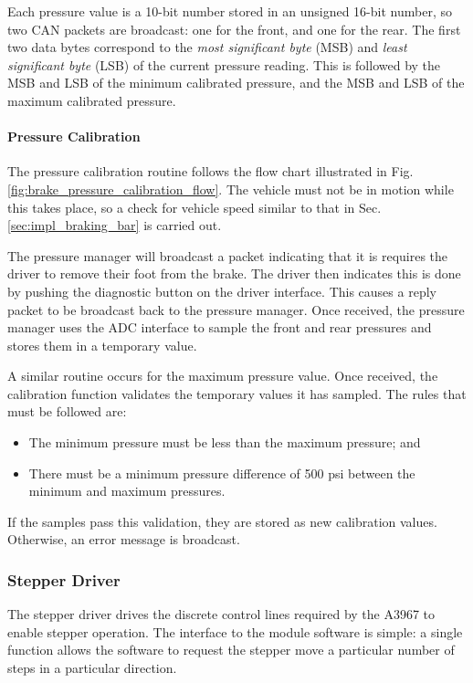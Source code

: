 Each pressure value is a 10-bit number stored in an unsigned 16-bit number, so two CAN packets are broadcast: one for the front, and one for the rear. The first two data bytes correspond to the \emph{most significant byte} (MSB) and \emph{least significant byte} (LSB) of the current pressure reading. This is followed by the MSB and LSB of the minimum calibrated pressure, and the MSB and LSB of the maximum calibrated pressure.

\paragraph{Pressure Calibration}

The pressure calibration routine follows the flow chart illustrated in Fig. \ref{fig:brake_pressure_calibration_flow}. The vehicle must not be in motion while this takes place, so a check for vehicle speed similar to that in Sec. \ref{sec:impl_braking_bar} is carried out. 

The pressure manager will broadcast a packet indicating that it is requires the driver to remove their foot from the brake. The driver then indicates this is done by pushing the diagnostic button on the driver interface. This causes a reply packet to be broadcast back to the pressure manager. Once received, the pressure manager uses the ADC interface to sample the front and rear pressures and stores them in a temporary value.

A similar routine occurs for the maximum pressure value. Once received, the calibration function validates the temporary values it has sampled. The rules that must be followed are:

\begin{itemize}
\item The minimum pressure must be less than the maximum pressure; and
\item There must be a minimum pressure difference of 500 psi between the minimum and maximum pressures.
\end{itemize}

If the samples pass this validation, they are stored as new calibration values. Otherwise, an error message is broadcast.

\subsubsection{Stepper Driver}

The stepper driver drives the discrete control lines required by the A3967 to enable stepper operation. The interface to the module software is simple: a single function allows the software to request the stepper move a particular number of steps in a particular direction.

